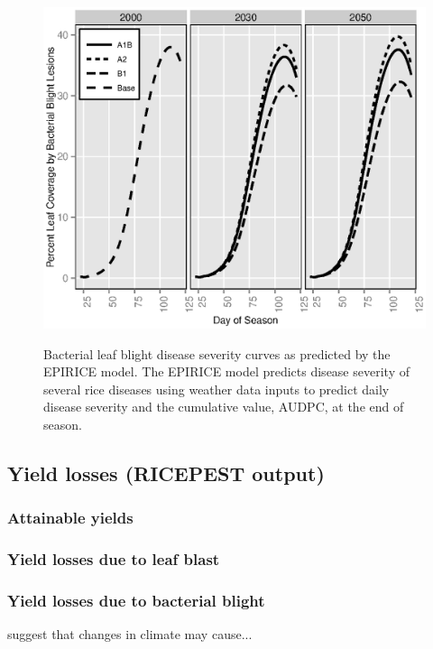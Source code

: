 \documentclass[preprint,12pt]{elsarticle}
\begin{document}
\begin{figure}[H]
  \includegraphics[width = 140mm]{figures/BB}
  \label{BBCurves}
  \caption{Bacterial leaf blight disease severity curves as predicted by the EPIRICE model. The EPIRICE model predicts disease severity of several rice diseases using weather data inputs to predict daily disease severity and the cumulative value, AUDPC, at the end of season.}
\end{figure}

\subsection{Yield losses (RICEPEST output)}
\subsubsection{Attainable yields}

\subsubsection{Yield losses due to leaf blast}

\subsubsection{Yield losses due to bacterial blight}


\citet{Burke2009} suggest that changes in climate may cause...
\end{document}
